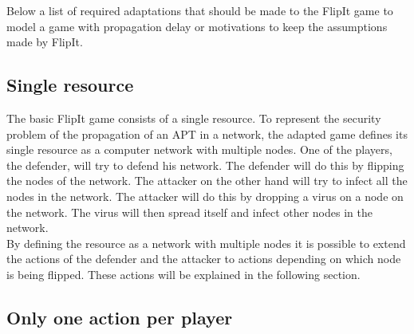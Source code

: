 
Below a list of required adaptations that should be made to the FlipIt game to model a game with propagation delay or motivations to keep the assumptions made by FlipIt.

\subsection{Single resource}
The basic FlipIt game consists of a single resource. To represent the security problem of the propagation of an APT in a network, the adapted game defines its single resource as a computer network with multiple
nodes. One of the players, the defender, will try to defend his network.
The defender will do this by flipping the nodes of the network.
The attacker on the other hand will try to infect all the nodes in the network. 
The attacker will do this by dropping a virus on a node on the network. The virus will then spread itself and infect other nodes in the network. \\
By defining the resource as a network with multiple nodes it is possible to extend the actions of the defender and the attacker to actions depending on which node is being flipped. These actions will be explained in the following section.
\subsection{Only one action per player}


